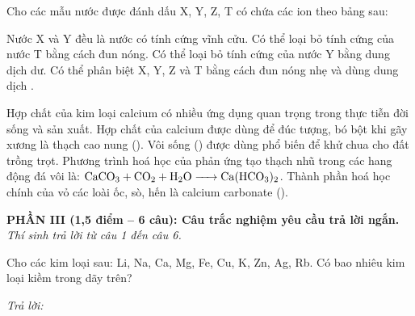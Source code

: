 \documentclass[11pt,a4paper]{article}
\def\loigiai#1{}
\begin{document}
\begin{ex}
Cho các mẫu nước được đánh dấu X, Y, Z, T có chứa các ion theo bảng sau:
\par{}\vspace{1pt}
\choiceTF
{Nước X và Y đều là nước có tính cứng vĩnh cửu.}
{Có thể loại bỏ tính cứng của nước T bằng cách đun nóng.}
{Có thể loại bỏ tính cứng của nước Y bằng dung dịch  dư.}
{Có thể phân biệt X, Y, Z và T bằng cách đun nóng nhẹ và dùng dung dịch .}
\loigiai{}
\end{ex}

\begin{ex}
Hợp chất của kim loại calcium có nhiều ứng dụng quan trọng trong thực tiễn đời sống và sản xuất.
\choiceTF
{Hợp chất của calcium được dùng để đúc tượng, bó bột khi gãy xương là thạch cao nung ().}
{Vôi sống () được dùng phổ biến để khử chua cho đất trồng trọt.}
{Phương trình hoá học của phản ứng tạo thạch nhũ trong các hang động đá vôi là: $\ce{CaCO3 + CO2 + H2O -> Ca(HCO3)2}$.}
{Thành phần hoá học chính của vỏ các loài ốc, sò, hến là calcium carbonate ().}
\loigiai{}
\end{ex}

\newpage

\noindent
\textbf{PHẦN III (1,5 điểm -- 6 câu): Câu trắc nghiệm yêu cầu trả lời ngắn.}\\
\textit{Thí sinh trả lời từ câu 1 đến câu 6.}

\setcounter{ex}{0}

\begin{ex}
Cho các kim loại sau: Li, Na, Ca, Mg, Fe, Cu, K, Zn, Ag, Rb. Có bao nhiêu kim loại kiềm trong dãy trên?
\par\noindent\textit{Trả lời:} \dotfill
\loigiai{}
\end{ex}
\end{document}
